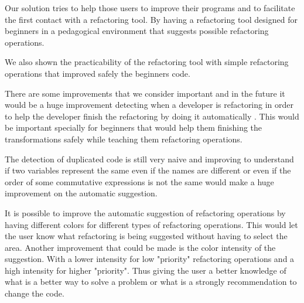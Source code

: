 Our solution tries to help those users to improve their programs and to facilitate
the first contact with a refactoring tool.
By having a refactoring tool designed for beginners in a pedagogical environment
that suggests possible refactoring operations.

We also shown the practicability of the refactoring tool with simple refactoring operations
that improved safely the beginners code.


There are some improvements that we consider important and in the future it would  %
be a huge improvement detecting when a developer is refactoring in order to help the developer finish the
refactoring by doing it automatically \cite{ge2012reconciling}. 
This would be important specially for beginners that would help them finishing
the transformations safely while teaching them refactoring operations. %

The detection of duplicated code is still very naive and improving to understand if
two variables represent the same even if the names are different or even if the
 order of some commutative expressions is not the same would make a huge improvement
 on the automatic suggestion.



It is possible to improve the automatic suggestion of refactoring operations by
having different colors for different types of refactoring operations.
This would let the user know what refactoring is being suggested without having to
select the area.
Another improvement that could be made is the color intensity of the suggestion.
With a lower intensity for low "priority" refactoring operations and a high intensity
for higher "priority". Thus giving the user a better knowledge of what is a better
way to solve a problem or what is a strongly recommendation to change the code.
